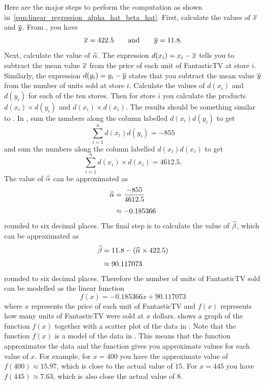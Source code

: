 \documentclass[a4paper,oneside,12pt]{article}
\begin{document}
Here are the major steps to perform the computation as shown
in~\eqref{eqn:linear_regression_alpha_hat_beta_hat}.  First, calculate
the values of $\overline{x}$ and $\overline{y}$.  From , you have
\[
\overline{x}
=
422.5
\qquad
\text{and}
\qquad
\overline{y}
=
11.8.
\]
Next, calculate the value of $\widehat{\alpha}$.  The expression
$d(x_i) = x_i - \overline{x}$ tells you to subtract the mean value $\overline{x}$
from the price of each unit of FantasticTV at store $i$.  Similarly,
the expression $d(y_i) = y_i - \overline{y}$ states that you subtract the
mean value $\overline{y}$ from the number of units sold at store $i$.
Calculate the values of $d(x_i)$ and $d(y_i)$ for each of the ten
stores.  Then for store $i$ you calculate the products
$d(x_i) \times d(y_i)$ and $d(x_i) \times d(x_i)$.  The results should
be something similar to
.  In
, sum the numbers
along the column labelled $d(x_i) d(y_i)$ to get
\[
\sum_{i=1}^n d(x_i) d(y_i)
=
-855
\]
and sum the numbers along the column labelled $d(x_i) d(x_i)$ to get
\[
\sum_{i=1}^n d(x_i) \times d(x_i)
=
4612.5.
\]
The value of $\widehat{\alpha}$ can be approximated as
\begin{align*}
\widehat{\alpha}
&=
\frac{-855}{4612.5} \\[4pt]
&\approx
-0.185366
\end{align*}
rounded to six decimal places.  The final step is to calculate the
value of $\widehat{\beta}$, which can be approximated as
\begin{align*}
\widehat{\beta}
&=
11.8 - (\widehat{\alpha} \times 422.5) \\[4pt]
&\approx
90.117073
\end{align*}
rounded to six decimal places.  Therefore the number of units of
FantasticTV sold can be modelled as the linear function
\[
f(x)
=
-0.185366 x + 90.117073
\]
where $x$ represents the price of each unit of FantasticTV and $f(x)$
represents how many units of FantasticTV were sold at $x$ dollars.
 shows a graph of the function
$f(x)$ together with a scatter plot of the data in
.  Note that the function $f(x)$ is a model of the
data in .  This means that the function
approximates the data and the function gives you approximate values
for each value of $x$.  For example, for $x = 400$ you have the
approximate value of $f(400) \approx 15.97$, which is close to the
actual value of $15$.  For $x = 445$ you have $f(445) \approx 7.63$,
which is also close the actual value of $8$.
\end{document}
